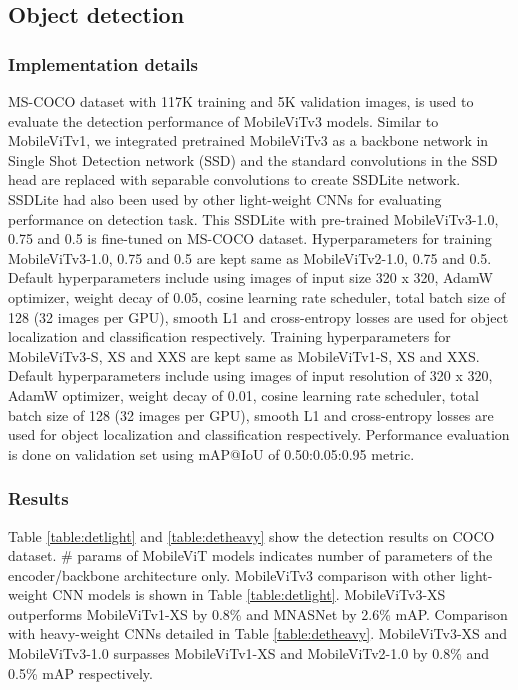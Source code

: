 \documentclass{article} \usepackage{iclr2022_conference,times}
\begin{document}
\subsection{Object detection} \label{results:obj}

\subsubsection{Implementation details}
MS-COCO dataset with 117K training and 5K validation images, is used to evaluate the detection performance of MobileViTv3 models. 
Similar to MobileViTv1, we integrated pretrained MobileViTv3 as a backbone network in Single Shot Detection network (SSD) \citep{liu2016ssd} and the standard convolutions in the SSD head are replaced with separable convolutions to create SSDLite network. 
SSDLite had also been used by other light-weight CNNs for evaluating performance on detection task. 
This SSDLite with pre-trained MobileViTv3-1.0, 0.75 and 0.5 is fine-tuned on MS-COCO dataset. 
Hyperparameters for training MobileViTv3-1.0, 0.75 and 0.5 are kept same as MobileViTv2-1.0, 0.75 and 0.5. 
Default hyperparameters include using images of input size 320 x 320, AdamW optimizer, weight decay of 0.05, cosine learning rate scheduler, total batch size of 128 (32 images per GPU), smooth L1 and cross-entropy losses are used for object localization and classification respectively. 
Training hyperparameters for MobileViTv3-S, XS and XXS are kept same as MobileViTv1-S, XS and XXS. 
Default hyperparameters include using images of input resolution of 320 x 320, AdamW optimizer, weight decay of 0.01, cosine learning rate scheduler, total batch size of 128 (32 images per GPU), smooth L1 and cross-entropy losses are used for object localization and classification respectively. 
Performance evaluation is done on validation set using mAP@IoU of 0.50:0.05:0.95 metric.

\subsubsection{Results}
Table \ref{table:detlight} and \ref{table:detheavy} show the detection results on COCO dataset. 
\# params of MobileViT models indicates number of parameters of the encoder/backbone architecture only. 
MobileViTv3 comparison with other light-weight CNN models is shown in Table \ref{table:detlight}.
MobileViTv3-XS outperforms MobileViTv1-XS by 0.8\% and MNASNet by 2.6\% mAP. 
Comparison with heavy-weight CNNs detailed in Table \ref{table:detheavy}. 
MobileViTv3-XS and MobileViTv3-1.0 surpasses MobileViTv1-XS and MobileViTv2-1.0 by 0.8\% and 0.5\% mAP respectively.
\end{document}
